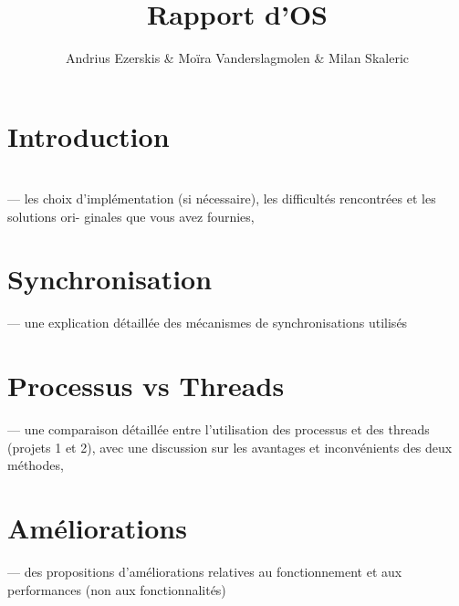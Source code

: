 \documentclass[utf8]{article}
\begin{document}
\begin{titlepage}
    

\author{Andrius Ezerskis \& Moïra Vanderslagmolen \& Milan Skaleric}
\title{Rapport d'OS}

\maketitle
\end{titlepage}

\section{Introduction}
\par
\section{}
— les choix d’implémentation (si nécessaire), les difficultés rencontrées et les solutions ori-
ginales que vous avez fournies,
\section{Synchronisation}
— une explication détaillée des mécanismes de synchronisations utilisés
\section{Processus vs Threads}
— une comparaison détaillée entre l’utilisation des processus et des threads (projets 1 et 2),
avec une discussion sur les avantages et inconvénients des deux méthodes,
\section{Améliorations}
— des propositions d’améliorations relatives au fonctionnement et aux performances (non
aux fonctionnalités)
\end{document}
